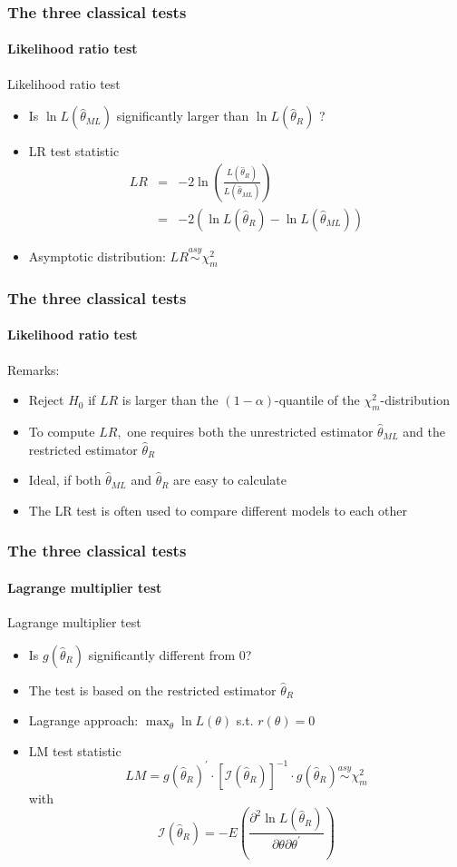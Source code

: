\documentclass[notes=show]{beamer}
\begin{document}
\begin{frame}\frametitle{The three classical tests}\framesubtitle{Likelihood ratio test}
Likelihood ratio test
\begin{itemize}
    \item Is $\ln L(\hat{\theta}_{ML})$ significantly larger than $\ln L(\hat{\theta}_{R})$ ?
    \item LR test statistic
    \begin{eqnarray*}
        LR &=&-2\ln \left( \frac{L(\hat{\theta}_{R})}{L(\hat{\theta}_{ML})}\right) \\
        &=&-2\left( \ln L(\hat{\theta}_{R})-\ln L(\hat{\theta}_{ML})\right)
    \end{eqnarray*}
    \item Asymptotic distribution: $LR\overset{asy}{\sim }\chi _{m}^{2}$
\end{itemize}
\end{frame}


\begin{frame}\frametitle{The three classical tests}\framesubtitle{Likelihood ratio test}
Remarks:
\begin{itemize}
    \item Reject $H_{0}$ if $LR$ is larger than the $\left( 1-\alpha \right)$-quantile of the $\chi _{m}^{2}$-distribution
    \item To compute $LR,$ one requires both the unrestricted estimator $\hat{\theta}_{ML}$ and the restricted estimator $\hat{\theta}_{R}$
    \item Ideal, if both $\hat{\theta}_{ML}$ and $\hat{\theta}_{R}$ are easy to calculate
    \item The LR test is often used to compare different models to each other
    \end{itemize}
\end{frame}


\begin{frame}\frametitle{The three classical tests}\framesubtitle{Lagrange multiplier test}
Lagrange multiplier test
\begin{itemize}
    \item Is $g(\hat{\theta}_{R})$ significantly different from 0?
    \item The test is based on the restricted estimator $\hat{\theta}_{R}$
    \item Lagrange approach: $\max_{\theta }\ln L(\theta )$ s.t. $r(\theta )=0$
    \item LM test statistic
    \begin{equation*}
        LM=g(\hat{\theta}_{R})^{\prime }\cdot \left[ \mathcal{I}(\hat{\theta}_{R})\right]^{-1}\cdot g(\hat{\theta}_{R})\overset{asy}{\sim }\chi _{m}^{2}
    \end{equation*}
    with
    \begin{equation*}
        \mathcal{I}(\hat{\theta}_{R})=-E\left( \frac{\partial ^{2}\ln L(\hat{\theta}_{R})}{\partial \theta \partial \theta ^{\prime }}\right)
    \end{equation*}
\end{itemize}
\end{frame}
\end{document}
